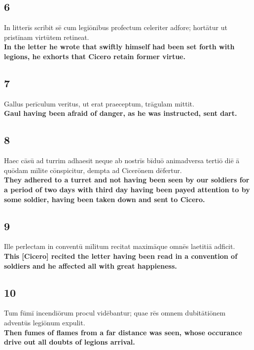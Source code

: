 \documentclass{article}
\begin{document}
\subsection*{6}
In litterīs scribit sē cum legiōnibus profectum celeriter adfore; hortātur ut pristīnam virtūtem retineat. \\
\textbf{In the letter he wrote that swiftly himself had been set forth with legions, he exhorts that Cicero retain former virtue.}

\subsection*{7}
Gallus perīculum veritus, ut erat praeceptum, trāgulam mittit. \\
\textbf{Gaul having been afraid of danger, as he was instructed, sent dart.}

\subsection*{8}
Haec cāsū ad turrim adhaesit neque ab nostrīs bīduō animadversa tertiō diē ā quōdam mīlite cōnspicitur, dempta ad Cicerōnem dēfertur. \\
\textbf{They adhered to a turret and not having been seen by our soldiers for a period of two days with third day having been payed attention to by some soldier, having been taken down and sent to Cicero.}

\subsection*{9}
Ille perlectam in conventū mīlitum recitat maximāque omnēs laetitiā adficit. \\
\textbf{This [Cicero] recited the letter having been read in a convention of soldiers and he affected all with great happieness.}

\subsection*{10}
Tum fūmī incendiōrum procul vidēbantur; quae rēs omnem dubitātiōnem adventūs legiōnum expulit.\\
\textbf{Then fumes of flames from a far distance was seen, whose occurance drive out all doubts of legions arrival.}
\end{document}
